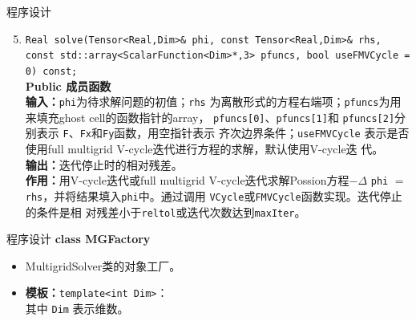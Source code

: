 \documentclass{beamer}
\begin{document}
\begin{frame}{程序设计}
  \begin{enumerate}[(1)] \setcounter{enumi}{4}
  \item \texttt{Real solve(Tensor<Real,Dim>\& phi, const Tensor<Real,Dim>\& rhs,
      const std::array<ScalarFunction<Dim>*,3> pfuncs,
      bool useFMVCycle = 0) const;}\\
          \textbf{Public 成员函数}\\
          \textbf{输入：}\texttt{phi}为待求解问题的初值；\texttt{rhs}
          为离散形式的方程右端项；\texttt{pfuncs}为用来填充ghost cell的函数指针的array，
                \texttt{pfuncs[0]}、\texttt{pfuncs[1]}和
                \texttt{pfuncs[2]}分别表示
                \texttt{F}、\texttt{Fx}和\texttt{Fy}函数，用空指针表示
                齐次边界条件；\texttt{useFMVCycle} 表示是否使用full
                multigrid V-cycle迭代进行方程的求解，默认使用V-cycle迭
                代。 \\
                \textbf{输出：}迭代停止时的相对残差。\\
                \textbf{作用：}用V-cycle迭代或full
          multigrid V-cycle迭代求解Possion方程$-\Delta$ \texttt{phi} $=$
                \texttt{rhs}，并将结果填入\texttt{phi}中。通过调用
          \texttt{VCycle}或\texttt{FMVCycle}函数实现。迭代停止的条件是相
          对残差小于\texttt{reltol}或迭代次数达到\texttt{maxIter}。
        \end{enumerate}

\end{frame}
\begin{frame}{程序设计}
  \textbf{\large class MGFactory}
\begin{itemize}
    \item MultigridSolver类的对象工厂。
    \item \textbf{模板：}\texttt{template<int Dim>}：\\
      其中 \texttt{Dim} 表示维数。
\end{itemize}
\end{frame}
\end{document}
